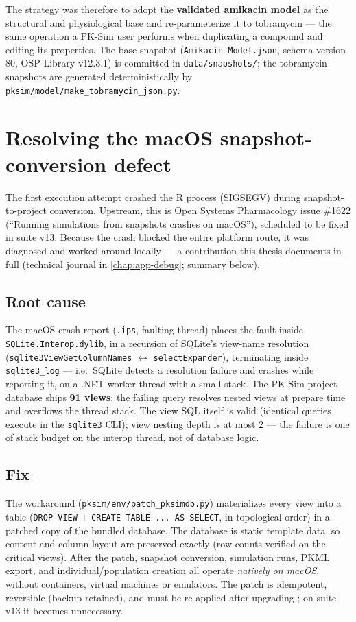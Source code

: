 The strategy was therefore to adopt the \textbf{validated amikacin model} as the structural and physiological base and re-parameterize it to tobramycin --- the same operation a PK-Sim user performs when duplicating a compound and editing its properties. The base snapshot (\texttt{Amikacin-Model.json}, schema version 80, OSP Library v12.3.1) is committed in \texttt{data/snapshots/}; the tobramycin snapshots are generated deterministically by \texttt{pksim/model/make\_tobramycin\_json.py}.

\section{Resolving the macOS snapshot-conversion defect}
\label{sec:pksim-workaround}

The first execution attempt crashed the R process (SIGSEGV) during snapshot-to-project conversion. Upstream, this is Open Systems Pharmacology issue \#1622 (``Running simulations from snapshots crashes on macOS''), scheduled to be fixed in suite v13. Because the crash blocked the entire platform route, it was diagnosed and worked around locally --- a contribution this thesis documents in full (technical journal in \cref{chap:app-debug}; summary below).

\subsection{Root cause}
The macOS crash report (\texttt{.ips}, faulting thread) places the fault inside \texttt{SQLite.Interop.dylib}, in a recursion of SQLite's view-name resolution (\texttt{sqlite3ViewGetColumnNames} $\leftrightarrow$ \texttt{selectExpander}), terminating inside \texttt{sqlite3\_log} --- i.e.\ SQLite detects a resolution failure and crashes while reporting it, on a .NET worker thread with a small stack. The PK-Sim project database ships \textbf{91 views}; the failing query resolves nested views at prepare time and overflows the thread stack. The view SQL itself is valid (identical queries execute in the \texttt{sqlite3} CLI); view nesting depth is at most 2 --- the failure is one of stack budget on the interop thread, not of database logic.

\subsection{Fix}
The workaround (\texttt{pksim/env/patch\_pksimdb.py}) materializes every view into a table (\texttt{DROP VIEW} + \texttt{CREATE TABLE ... AS SELECT}, in topological order) in a patched copy of the bundled database. The database is static template data, so content and column layout are preserved exactly (row counts verified on the critical views). After the patch, snapshot conversion, simulation runs, PKML export, and individual/population creation all operate \emph{natively on macOS}, without containers, virtual machines or emulators. The patch is idempotent, reversible (backup retained), and must be re-applied after upgrading ; on suite v13 it becomes unnecessary.

